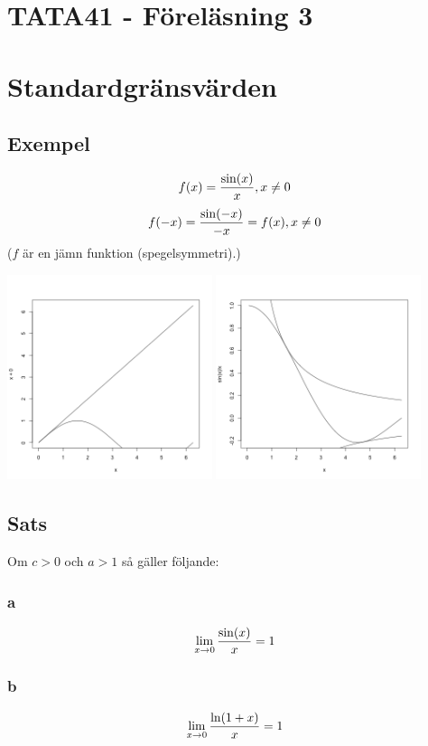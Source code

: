 \documentclass{article}
\begin{document}
\section{TATA41 - Föreläsning 3}

\section{Standardgränsvärden}

\subsection{Exempel}
$$ f(x) = \frac{\sin(x)}{x}, x\neq 0 $$
$$ f(-x) = \frac{\sin(-x)}{-x} = f(x), x\neq 0 $$
($f$ är en jämn funktion (spegelsymmetri).)

\includegraphics[height=60mm, width=60mm]{img/xsinx.png}
\includegraphics[height=60mm, width=60mm]{img/sinxx.png}
\subsection{Sats}
Om $c>0$ och $a>1$ så gäller följande:\\
\subsubsection{a}
$$\displaystyle \lim_{x \rightarrow 0} \frac{\sin(x)}{x} = 1$$
\subsubsection{b}
$$\displaystyle \lim_{x \rightarrow 0} \frac{\ln(1+x)}{x} = 1$$
\end{document}
